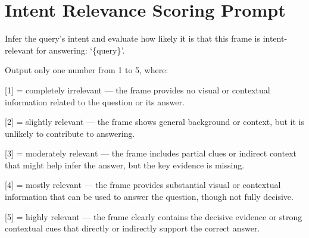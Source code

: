 \documentclass[11pt]{article}
\begin{document}
\section{Intent Relevance Scoring Prompt}
\label{appendix:prompt}

\begin{tcolorbox}[
  fonttitle = \small\bfseries,
  title=Intent-Relevance Scoring Prompt,
  colframe=gray!2!black,
  colback=gray!2!white,
  boxrule=1pt,
  boxsep=0pt,
  left=5pt,
  right=5pt,
  fontupper=\setlength{\parskip}{6pt}\footnotesize, %
  halign title = flush center,
]

Infer the query’s intent and evaluate how likely it is that this frame is intent-relevant for answering: ‘\{query\}’. 

Output only one number from 1 to 5, where:

[1] = completely irrelevant — the frame provides no visual or contextual information related to the question or its answer.

[2] = slightly relevant — the frame shows general background or context, but it is unlikely to contribute to answering.

[3] = moderately relevant — the frame includes partial clues or indirect context that might help infer the answer, but the key evidence is missing.

[4] = mostly relevant — the frame provides substantial visual or contextual information that can be used to answer the question, though not fully decisive.

[5] = highly relevant — the frame clearly contains the decisive evidence or strong contextual cues that directly or indirectly support the correct answer.

        
\end{tcolorbox}
\end{document}

